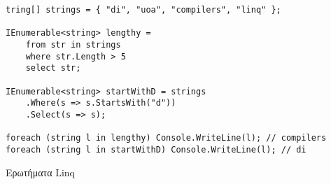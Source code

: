 \begin{listing}[htbp]
\begin{verbatim}
tring[] strings = { "di", "uoa", "compilers", "linq" };

IEnumerable<string> lengthy = 
    from str in strings 
    where str.Length > 5 
    select str;

IEnumerable<string> startWithD = strings
    .Where(s => s.StartsWith("d"))
    .Select(s => s);

foreach (string l in lengthy) Console.WriteLine(l); // compilers
foreach (string l in startWithD) Console.WriteLine(l); // di
\end{verbatim}
\caption{Ερωτήματα Linq}
\label{linqExec}
\end{listing}